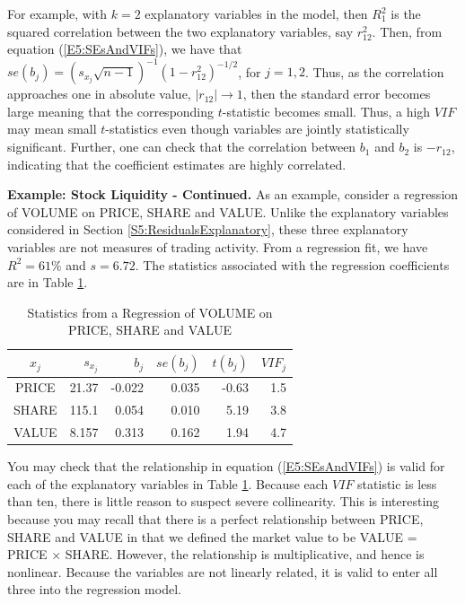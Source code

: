 
For example, with $k=2$ explanatory variables in the model, then
$R_1^2$ is the squared correlation between the two explanatory
variables, say $r_{12}^2$. Then, from equation
(\ref{E5:SEsAndVIFs}), we have that $se(b_j) = \left( s_{x_j}
\sqrt{n-1} \right)^{-1} \left( 1-r_{12}^2\right)^{-1/2}$, for
$j=1,2$. Thus, as the correlation approaches one in absolute value,
$|r_{12}| \rightarrow 1$, then the standard error becomes large
meaning that the corresponding $t$-statistic becomes small. Thus, a
high $VIF$ may mean small $t$-statistics even though variables are
jointly statistically significant. Further, one can check that the
correlation between $b_1$ and $b_2$ is $-r_{12}$, indicating that
the coefficient estimates are highly correlated.



\linejed

\textbf{Example: Stock Liquidity - Continued.} As an example,
consider a regression of VOLUME on PRICE, SHARE and VALUE. Unlike
the explanatory variables considered in Section
\ref{S5:ResidualsExplanatory}, these three explanatory variables are
not measures of trading activity. From a regression fit, we have
$R^2=61\%$ and $s=6.72$. The statistics associated with the
regression coefficients are in Table \ref{T5:LiquidRegression}.


\begin{table}[h]
\caption{\label{T5:LiquidRegression} Statistics from
a Regression of VOLUME on PRICE, SHARE and VALUE}

\begin{tabular}{crrrrr}
\hline
$x_j$ & $s_{x_j}$ & $b_j$ & $se(b_j)$ & $t(b_j)$ & $VIF_j$ \\
\hline PRICE& 21.37 & -0.022 & 0.035&
-0.63& 1.5 \\
SHARE & 115.1 & 0.054 & 0.010 &
5.19 & 3.8 \\
VALUE & 8.157 & 0.313 & 0.162 & 1.94 & 4.7
\\ \hline
\end{tabular}
\end{table}

You may check that the relationship in equation
(\ref{E5:SEsAndVIFs}) is valid for each of the explanatory variables
in Table \ref{T5:LiquidRegression}. Because each $VIF$ statistic is
less than ten, there is little reason to suspect severe
collinearity. This is interesting because you may recall that there
is a perfect relationship between PRICE, SHARE and VALUE in that we
defined the market value to be VALUE = PRICE $\times $ SHARE.
However, the relationship is multiplicative, and hence is nonlinear.
Because the variables are not linearly related, it is valid to enter
all three into the regression model.

